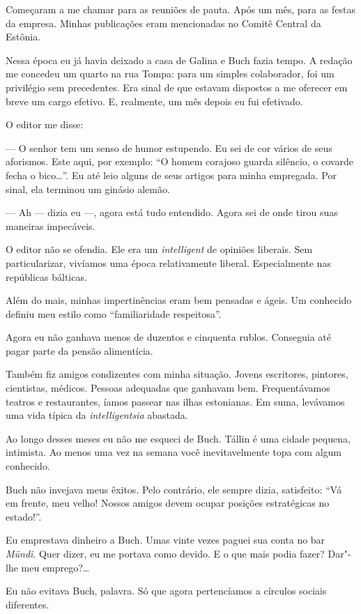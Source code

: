 Começaram a me chamar para as reuniões de pauta. Após um mês, para as
festas da empresa. Minhas publicações eram mencionadas no Comitê Central
da Estônia.

Nessa época eu já havia deixado a casa de Galina e Buch fazia tempo. A
redação me concedeu um quarto na rua Tompa: para um simples colaborador,
foi um privilégio sem precedentes. Era sinal de que estavam dispostos a me
oferecer em breve um cargo efetivo. E, realmente, um mês depois eu fui
efetivado.

O editor me disse:

--- O senhor tem um senso de humor estupendo. Eu sei de cor vários de
seus aforismos. Este aqui, por exemplo: ``O homem corajoso guarda
silêncio, o covarde fecha o bico\ldots{}''. Eu até leio alguns de
seus artigos para minha empregada. Por sinal, ela terminou um ginásio
alemão.

--- Ah --- dizia eu ---, agora está tudo entendido. Agora sei de onde
tirou suas maneiras impecáveis.

O editor não se ofendia. Ele era um \emph{intelligent} de opiniões
liberais. Sem particularizar, vivíamos uma época relativamente liberal.
Especialmente nas repúblicas bálticas.

Além do mais, minhas impertinências eram bem pensadas e ágeis. Um
conhecido definiu meu estilo como ``familiaridade respeitosa''.

Agora eu não ganhava menos de duzentos e cinquenta rublos. Conseguia até
pagar parte da pensão alimentícia.

Também fiz amigos condizentes com minha situação. Jovens escritores,
pintores, cientistas, médicos. Pessoas adequadas que ganhavam bem.
Frequentávamos teatros e restaurantes, íamos passear nas ilhas
estonianas. Em suma, levávamos uma vida típica da \emph{intelligentsia}
abastada.

Ao longo desses meses eu não me esqueci de Buch. Tállin é uma cidade
pequena, intimista. Ao menos uma vez na semana você inevitavelmente topa com algum
conhecido.

Buch não invejava meus êxitos. Pelo contrário, ele sempre dizia,
satisfeito: ``Vá em frente, meu velho! Nossos amigos devem ocupar
posições estratégicas no estado!''. %

Eu emprestava dinheiro a Buch. Umas vinte vezes paguei sua conta no bar
\emph{Mündi}. Quer dizer, eu me portava como devido. E o que mais podia
fazer? Dar"-lhe meu emprego?\ldots{}

Eu não evitava Buch, palavra. Só que agora pertencíamos a círculos
sociais diferentes.

